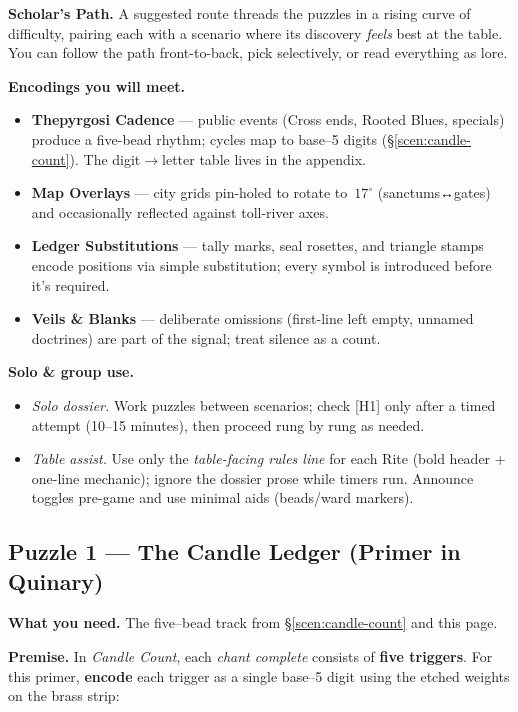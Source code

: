 \documentclass[11pt]{article}
\numberwithin{equation}{section} %
\theoremstyle{plain} %
\theoremstyle{definition} %
\theoremstyle{remark} %
\begin{document}
\medskip
\noindent\textbf{Scholar's Path.} A suggested route threads the puzzles in a rising curve of difficulty, pairing each with a scenario where its discovery \emph{feels} best at the table. You can follow the path front-to-back, pick selectively, or read everything as lore.

\medskip
\noindent\textbf{Encodings you will meet.}
\begin{itemize}\setlength\itemsep{0.3em}
  \item \textbf{Thepyrgosi Cadence} --- public events (Cross ends, Rooted Blues, specials) produce a five-bead rhythm; cycles map to base--5 digits (\S\ref{scen:candle-count}). The digit$\rightarrow$letter table lives in the appendix.
  \item \textbf{Map Overlays} --- city grids pin-holed to rotate to \(\,17^\circ\) (sanctums↔gates) and occasionally reflected against toll-river axes.
  \item \textbf{Ledger Substitutions} --- tally marks, seal rosettes, and triangle stamps encode positions via simple substitution; every symbol is introduced before it's required.
  \item \textbf{Veils \& Blanks} --- deliberate omissions (first-line left empty, unnamed doctrines) are part of the signal; treat silence as a count.
\end{itemize}

\medskip
\noindent\textbf{Solo \& group use.}
\begin{itemize}\setlength{\itemsep}{0.3em}
  \item \emph{Solo dossier.} Work puzzles between scenarios; check \textsc{[H1]} only after a timed attempt (10--15 minutes), then proceed rung by rung as needed.
  \item \emph{Table assist.} Use only the \emph{table-facing rules line} for each Rite (bold header + one-line mechanic); ignore the dossier prose while timers  run. Announce toggles pre-game and use minimal aids (beads/ward markers).
\end{itemize}
 
\subsection{Puzzle 1 --- The Candle Ledger (Primer in Quinary)}
\label{pz:candle-ledger}

\noindent\textbf{What you need.} The five--bead track from \S\ref{scen:candle-count} and this page.

\medskip
\noindent\textbf{Premise.} In \emph{Candle Count}, each \emph{chant complete} consists of \textbf{five triggers}. For this primer, \textbf{encode} each trigger as a single base--5 digit using the etched weights on the brass strip:
\end{document}
